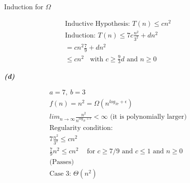 \documentclass{article}
\begin{document}
\begin{enumerate}
\begin{enumerate}
			Induction for $\Omega$

			\begin{align*}
			& \text{Inductive Hypothesis: } T(n) \leq cn^2\\
			& \text{Induction: } T(n) \leq 7c\frac{n^2}{3^2} + dn^2 \\
			& = cn^2 \frac{7}{9} + dn^2 \\
			& \leq cn^2 \ \ \ \ \text{with $c \geq \frac{9}{3}d$ and $n \geq 0$}
			\end{align*}

		\item[\textbf{\emph{(d)}}]

			\begin{align*}
			& a = 7,\ b = 3 \\
			& f(n) = n^2 = \Omega(n^{log_37 + \epsilon}) \\
			& lim_{n\rightarrow \infty}\frac{n^2}{n^{log_37+ \epsilon}} < \infty \text{   (it is polynomially larger)} \\
			& \text{Regularity condition:} \\
			& 7\frac{n^2}{3^2} \leq cn^2 \\ 
			& \frac{7}{9}n^2 \leq cn^2 \ \ \ \ \text{ for $c \geq 7/9$ and $c \leq 1$ and $n \geq 0$}\\ 
			& \text{(Passes)} \\
			& \text{Case 3: } \Theta(n^2)
			\end{align*}

	\end{enumerate}

\end{enumerate}
\end{document}
